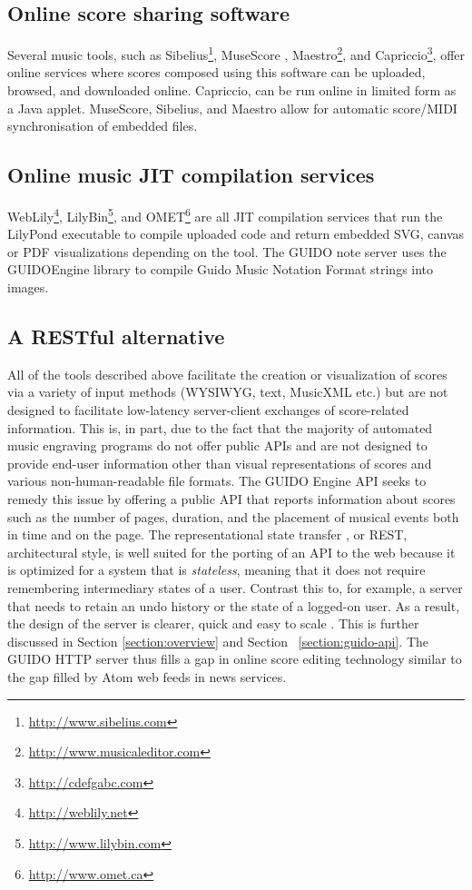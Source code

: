 \documentclass[11pt,a4paper]{article}
\newcommand{\footurl}[1]	{\footnote{\url{#1}}}
\begin{document}
\subsection{Online score sharing software}\label{subsection:sharing}
Several music tools, such as Sibelius\footurl{http://www.sibelius.com}, MuseScore \cite{musescore}, Maestro\footurl{http://www.musicaleditor.com}, and Capriccio\footurl{http://cdefgabc.com}, offer online services where scores composed using this software can be uploaded, browsed, and downloaded online.  Capriccio, can be run online in limited form as a Java applet.  MuseScore, Sibelius, and Maestro allow for automatic score/MIDI synchronisation of embedded files.
\subsection{Online music JIT compilation services}\label{subsection:jit}
WebLily\footurl{http://weblily.net}, LilyBin\footurl{http://www.lilybin.com}, and OMET\footurl{http://www.omet.ca} are all JIT compilation services that run the LilyPond executable to compile uploaded code and return embedded SVG, canvas or PDF visualizations depending on the tool.  The GUIDO note server \cite{renz98} uses the GUIDOEngine library to compile Guido Music Notation Format \cite{hoos98} strings into images.
\subsection{A RESTful alternative}\label{subsection:restful}

All of the tools described above facilitate the creation or visualization of scores via a variety of input methods (WYSIWYG, text, MusicXML etc.) but are not designed to facilitate low-latency server-client exchanges of score-related information.  This is, in part, due to the fact that the majority of automated music engraving programs do not offer public APIs and are not designed to provide end-user information other than visual representations of scores and various non-human-readable file formats.  The GUIDO Engine API \cite{daudin09a} \cite{guidolib1.52} seeks to remedy this issue by offering a public API that reports information about scores such as the number of pages, duration, and the placement of musical events both in time and on the page.  The representational state transfer \cite{Fielding00}, or REST, architectural style, is well suited for the porting of an API to the web because it is optimized for a system that is \emph{stateless}, meaning that it does not require remembering intermediary states of a user.  Contrast this to, for example, a server that needs to retain an undo history or the state of a logged-on user.  As a result, the design of the server is clearer, quick and easy to scale \cite{richardson2008restful}.  This is further discussed in Section \ref{section:overview} and Section ~\ref{section:guido-api}.  The GUIDO HTTP server thus fills a gap in online score editing technology similar to the gap filled by Atom web feeds in news services.
\end{document}

